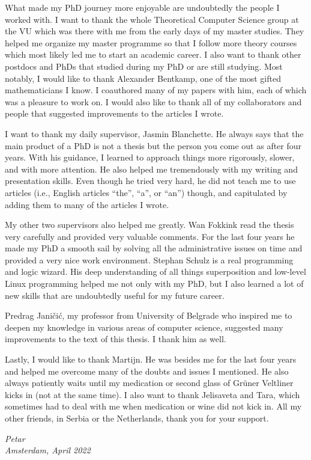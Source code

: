 What made my PhD journey more enjoyable are undoubtedly the people I worked
with. I want to thank the whole Theoretical Computer Science group at the VU
which was there with me from the early days of my master studies. They helped me
organize my master programme so that I follow more theory courses which most
likely led  me to start an academic career. I also want to thank other postdocs
and PhDs that studied during my PhD or are still studying. Most notably, I would
like to thank Alexander Bentkamp, one of the most gifted mathematicians I know.
I coauthored many of my papers with him, each of which was a pleasure to work
on. I would also like to thank all of my collaborators and people that suggested
improvements to the articles I wrote.

I want to thank my daily supervisor, Jasmin Blanchette. He always says that the
main product of a PhD is not a thesis but the person you come out as after four
years. With his guidance, I learned to approach things more rigorously, slower,
and with more attention. He also helped me tremendously  with my writing and
presentation skills. Even though he tried very hard, he did not teach me to use
articles (i.e., English articles ``the'', ``a'', or ``an'') though, and
capitulated by adding them to many of the articles I wrote.

My other two supervisors also helped me greatly. Wan Fokkink read the thesis
very carefully and provided very valuable comments. For the last four years he
made my PhD a smooth sail by solving all the administrative issues on time and
provided a very nice work environment. Stephan Schulz is a real programming and
logic wizard. His deep understanding of all things superposition and low-level
Linux programming helped me not only with my PhD, but I also learned a lot of
new skills that are undoubtedly useful for my future career.

Predrag Jani\v{c}i\'{c}, my professor from University of Belgrade who 
inspired me to deepen my knowledge in various areas of computer science, suggested
many improvements to the text of this thesis. I thank him as well.

Lastly, I would like to thank Martijn. He was besides me for the last four years
and helped me overcome many of the doubts and issues I mentioned. He also always
patiently waits until my medication or second glass of Grüner Veltliner kicks in
(not at the same time). I also want to thank Jelisaveta and Tara, which
sometimes had to deal with me when medication or wine did not kick in. All my other friends,
in Serbia or the Netherlands, thank you for your support.

 

\begin{flushright}
{\makeatletter\itshape
    Petar \\
    Amsterdam, April 2022
\makeatother}
\end{flushright}



